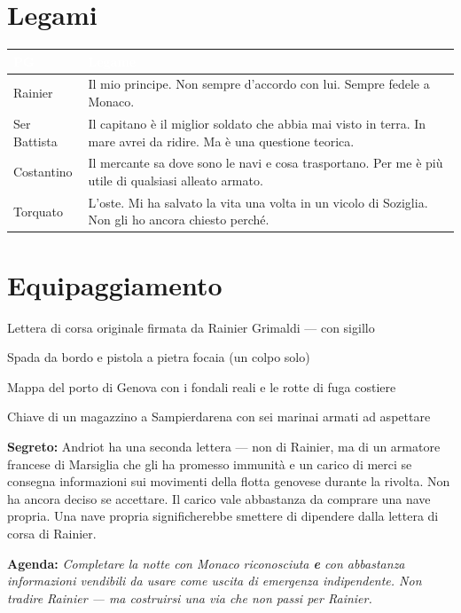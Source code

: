 \section*{Legami}

\begin{table}[h]
\centering\renewcommand{\arraystretch}{1.4}
\begin{tabularx}{\linewidth}{@{}L{2.6cm} X@{}}
  \toprule{}
  \textcolor{white}{\textbf{PG}} & \textcolor{white}{\textbf{Legame}} \\
  \midrule
  Rainier & Il mio principe. Non sempre d'accordo con lui. Sempre fedele a Monaco. \\
  Ser Battista & Il capitano è il miglior soldato che abbia mai visto in terra. In mare avrei da ridire. Ma è una questione teorica. \\
  Costantino & Il mercante sa dove sono le navi e cosa trasportano. Per me è più utile di qualsiasi alleato armato. \\
  Torquato & L'oste. Mi ha salvato la vita una volta in un vicolo di Soziglia. Non gli ho ancora chiesto perché. \\
  \bottomrule
\end{tabularx}
\end{table}

\section*{Equipaggiamento}
\begin{goldlist}
  \item Lettera di corsa originale firmata da Rainier Grimaldi — con sigillo
  \item Spada da bordo e pistola a pietra focaia (un colpo solo)
  \item Mappa del porto di Genova con i fondali reali e le rotte di fuga costiere
  \item Chiave di un magazzino a Sampierdarena con sei marinai armati ad aspettare
\end{goldlist}


\begin{secretbox}
  \textbf{Segreto:} Andriot ha una seconda lettera — non di Rainier, ma di un
  armatore francese di Marsiglia che gli ha promesso immunità e un carico
  di merci se consegna informazioni sui movimenti della flotta genovese
  durante la rivolta. Non ha ancora deciso se accettare. Il carico vale
  abbastanza da comprare una nave propria. Una nave propria significherebbe
  smettere di dipendere dalla lettera di corsa di Rainier.

  \medskip\noindent\textcolor{SecretRed}{\textbf{Agenda:}}
  \textit{Completare la notte con Monaco riconosciuta \textbf{e} con abbastanza
  informazioni vendibili da usare come uscita di emergenza indipendente.
  Non tradire Rainier — ma costruirsi una via che non passi per Rainier.}
\end{secretbox}

